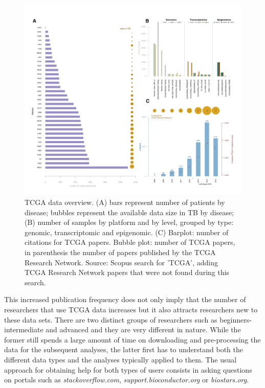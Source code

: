 \begin{figure}
\centering
\includegraphics[width=1.0\textwidth]{images/figure1_draft2.pdf}
\caption[]{TCGA data overview. (A) bars represent number of patients by disease; bubbles represent the available data size in TB by disease; (B) number of samples by platform and by level, grouped by type: genomic, transcriptomic and epigenomic. (C) Barplot: number of citations for TCGA papers. Bubble plot: number of TCGA papers, in parenthesis the number of papers published by the TCGA Research Network. Source: Scopus search for 'TCGA', adding TCGA Research Network papers that were not found during this search.}
\label{fig:my_label}
\end{figure}

This increased publication frequency does not only imply that the number of researchers that use TCGA data increases but it also attracts researchers new to these data sets.
There are two distinct groups of researchers such as beginners-intermediate and advanced and they are very different in nature. 
While the former still spends a large amount of time on downloading and pre-processing the data for the subsequent analyses, the latter first has to understand both the different data types and the analyses typically applied to them. The usual approach for obtaining help for both types of users consists in asking questions on portals such as \textit{stackoverflow.com}, \textit{support.bioconductor.org} or \textit{biostars.org}.\\

